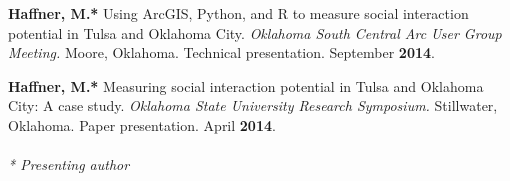 \begin{cventries}
   \cventry
      {}
      {}
      {}
      {}
      {
        \begin{cvitems}
          \vspace{-2mm}
        \item {\textbf{Haffner, M.*} Using ArcGIS, Python, and R to measure
            social interaction potential in Tulsa and Oklahoma City.
            \textit{Oklahoma South Central Arc User Group Meeting.} Moore,
            Oklahoma. Technical presentation. September \textbf{2014}.}
            \end{cvitems}
            }

   \cventry
      {}
      {}
      {}
      {}
      {
        \begin{cvitems}
          \vspace{-2mm}
        \item {\textbf{Haffner, M.*} Measuring social interaction potential in
            Tulsa and Oklahoma City: A case study. \textit{Oklahoma State
              University Research Symposium.} Stillwater,
            Oklahoma. Paper presentation. April \textbf{2014}.} \\\\
          \textit{* Presenting author}
              \end{cvitems}
            }

\end{cventries}